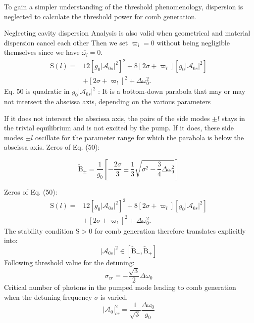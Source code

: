\documentclass[main.tex]{subfiles}
\begin{document}
To gain a simpler understanding of the threshold phenomenology, dispersion is neglected to calculate the threshold power for comb generation.

Neglecting cavity dispersion
Analysis is also valid when geometrical and material dispersion cancel each other
Then we set $\varpi_l=0$ without being negligible themselves since we have $\overline{\omega_l}=0$.
$$
\begin{aligned}
\mathrm{S}(l)=& 12\left[g_0\left|\mathcal{A}_{0 s}\right|^2\right]^2+8\left[2 \sigma+\varpi_l\right]\left[g_0\left|\mathcal{A}_{0 s}\right|^2\right] \\
&+\left[2 \sigma+\varpi_l\right]^2+\Delta \omega_0^2 .
\end{aligned}
$$
Eq. 50 is quadratic in $g_0\left|\mathcal{A}_{0 s}\right|^2$ : It is a bottom-down parabola that may or may not intersect the abscissa axis, depending on the various parameters

If it does not intersect the abscissa axis, the pairs of the side modes $\pm l$ stays in the trivial equilibrium and is not excited by the pump. If it does, these side modes $\pm l$ oscillate for the parameter range for which the parabola is below the abscissa axis.
Zeros of Eq. (50):

$$
\tilde{\mathrm{B}}_{\pm}=\frac{1}{g_0}\left[-\frac{2 \sigma}{3} \pm \frac{1}{3} \sqrt{\sigma^2-\frac{3}{4} \Delta \omega_0^2}\right]
$$

Zeros of Eq. (50):
$$
\begin{aligned}
\mathrm{S}(l)=& 12\left[g_0\left|\mathcal{A}_{0 s}\right|^2\right]^2+8\left[2 \sigma+\varpi_l\right]\left[g_0\left|\mathcal{A}_{0 s}\right|^2\right] \\
&+\left[2 \sigma+\varpi_l\right]^2+\Delta \omega_0^2 .
\end{aligned}
$$
The stability condition $\mathrm{S}>0$ for comb generation therefore translates explicitly into:
$$
\left|\mathcal{A}_{0 s}\right|^2 \in\left[\tilde{\mathrm{B}}_{-}, \tilde{\mathrm{B}}_{+}\right]
$$
Following threshold value for the detuning:
$$
\sigma_{c r}=-\frac{\sqrt{3}}{2} \Delta \omega_0
$$
Critical number of photons in the pumped mode leading to comb generation when the detuning frequency $\sigma$ is varied.
$$
\left|\mathcal{A}_0\right|_{c r}^2=\frac{1}{\sqrt{3}} \frac{\Delta \omega_0}{g_0}
$$
\end{document}
